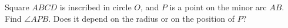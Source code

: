 Square $ABCD$ is inscribed in circle $O$, and $P$ is a point on the minor arc $AB$. Find $\angle APB$. Does it depend on the radius or on the position of $P$?
